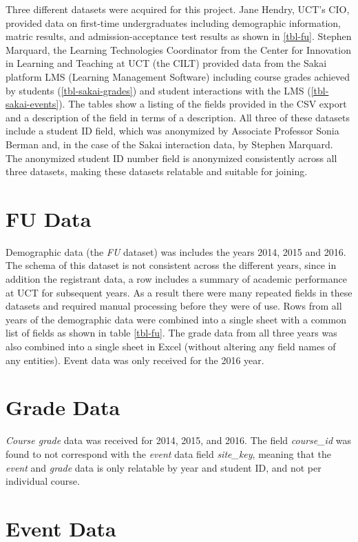 Three different datasets were acquired for this project. Jane Hendry, UCT's CIO, provided data on first-time undergraduates including demographic information, matric results, and admission-acceptance test results as shown in \ref{tbl-fu}. Stephen Marquard, the Learning Technologies Coordinator from the Center for Innovation in Learning and Teaching at UCT (the CILT) provided data from the Sakai platform LMS (Learning Management Software) including course grades achieved by students (\ref{tbl-sakai-grades}) and student interactions with the LMS (\ref{tbl-sakai-events}). The tables show a listing of the fields provided in the CSV export and a description of the field in terms of a description. All three of these datasets include a student ID field, which was anonymized by Associate Professor Sonia Berman and, in the case of the Sakai interaction data, by Stephen Marquard. The anonymized student ID number field is anonymized consistently across all three datasets, making these datasets relatable and suitable for joining.



\section{FU Data}
Demographic data (the \textit{FU} dataset) was includes the years 2014, 2015 and 2016. The schema of this dataset is not consistent across the different years, since in addition the registrant data, a row includes a summary of academic performance at UCT for subsequent years. As a result there were many repeated fields in these datasets and required manual processing before they were of use. Rows from all years of the demographic data were combined into a single sheet with a common list of fields as shown in table \ref{tbl-fu}. The grade data from all three years was also combined into a single sheet in Excel (without altering any field names of any entities). Event data was only received for the 2016 year.



\section{Grade Data}
\textit{Course grade} data was received for 2014, 2015, and 2016. The field \textit{course\_id} was found to not correspond with the \textit{event} data field \textit{site\_key}, meaning that the \textit{event} and \textit{grade} data is only relatable by year and student ID, and not per individual course.



\section{Event Data}


